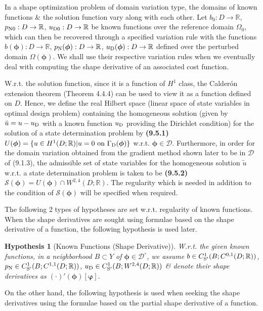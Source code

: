 \documentclass[oneside]{book}
\numberwithin{equation}{section}
\newtheorem{hypothesis}{Hypothesis}[chapter]
\begin{document}
In a shape optimization problem of domain variation type, the domains of known functions \& the solution function vary along with each other. Let $b_0:D\to\mathbb{R}$, $p_{\rm N0}:D\to\mathbb{R}$, $u_{\rm D0}:D\to\mathbb{R}$ be known functions over the reference domain $\Omega_0$, which can then be recovered through a specified variation rule with the functions $b(\boldsymbol{\phi}):D\to\mathbb{R}$, $p_{\rm N}(\boldsymbol{\phi}):D\to\mathbb{R}$, $u_{\rm D}(\boldsymbol{\phi}):D\to\mathbb{R}$ defined over the perturbed domain $\Omega(\boldsymbol{\phi})$. We shall use their respective variation rules when we eventually deal with computing the shape derivative of an associated cost function.

W.r.t. the solution function, since it is a function of $H^1$ class, the Calder\'on extension theorem (Theorem 4.4.4) can be used to view it as a function defined on $D$. Hence, we define the real Hilbert space (linear space of state variables in optimal design problem) containing the homogeneous solution (given by $\tilde{u} = u - u_{\rm D}$ with a known function $u_{\rm D}$ providing the Dirichlet condition) for the solution of a state determination problem by \textbf{(9.5.1)} $U(\boldsymbol{\phi}) = \{u\in H^1(D;\mathbb{R})|u = 0\mbox{ on }\Gamma_{\rm D}(\boldsymbol{\phi})\}$ w.r.t. $\boldsymbol{\phi}\in\mathcal{D}$. Furthermore, in order for the domain variation obtained from the gradient method shown later to be in $\mathcal{D}$ of (9.1.3), the admissible set of state variables for the homogeneous solution $\tilde{u}$ w.r.t. a state determination problem is taken to be \textbf{(9.5.2)} $\mathcal{S}(\boldsymbol{\phi}) = U(\boldsymbol{\phi})\cap W^{2,4}(D;\mathbb{R})$. The regularity which is needed in addition to the condition of $\mathcal{S}(\boldsymbol{\phi})$ will be specified when required.

The following 2 types of hypotheses are set w.r.t. regularity of known functions. When the shape derivatives are sought using formulae based on the shape derivative of a function, the following hypothesis is used later.

\begin{hypothesis}[Known Functions (Shape Derivative)]
	W.r.t. the given known functions, in a neighborhood $B\subset Y$ of $\boldsymbol{\phi}\in\mathcal{D}^\circ$, we assume $b\in C_{\rm S'}^1(B;C^{0,1}(D;\mathbb{R}))$, $p_{\rm N}\in C_{\rm S'}^1(B;C^{1,1}(D;\mathbb{R}))$, $u_{\rm D}\in C_{\rm S'}^1(B;W^{2,4}(D;\mathbb{R}))$ \& denote their shape derivatives as $(\cdot)'(\boldsymbol{\phi})[\boldsymbol{\varphi}]$.
\end{hypothesis}
On the other hand, the following hypothesis is used when seeking the shape derivatives using the formulae based on the partial shape derivative of a function.
\end{document}
